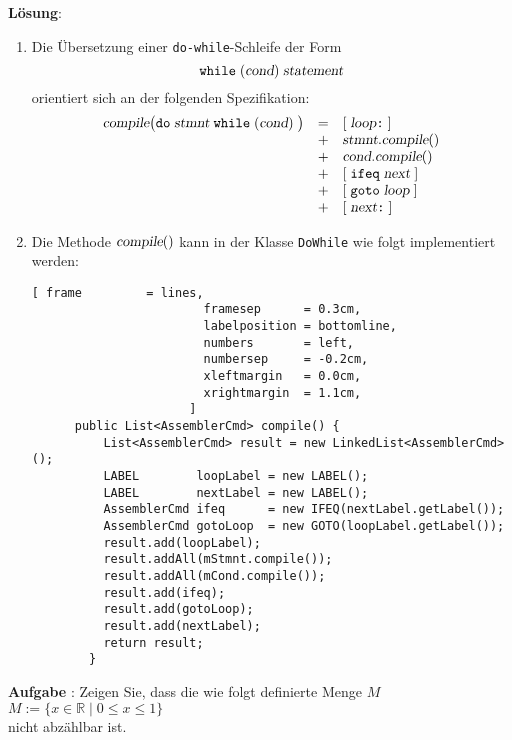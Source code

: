 \documentclass{article}
\newcounter{aufgabe}
\newcommand{\exercise}{\vspace*{0.1cm}

\stepcounter{aufgabe}
\vspace*{0.3cm}

\noindent
\textbf{Aufgabe \arabic{aufgabe}}: }
\newcommand{\solution}{
\vspace*{0.3cm}

\noindent
\textbf{L\"osung}: }
\begin{document}
\solution
\begin{enumerate}
\item Die \"Ubersetzung einer \texttt{do-while}-Schleife der Form
      \[ \texttt{while}\;(\textsl{cond})\;\textsl{statement} \]
      orientiert sich an der folgenden Spezifikation:
      \[
      \begin{array}[t]{lcl}
        \textsl{compile}\bigl(\mathtt{do}\; \textsl{stmnt}\; \texttt{while}\; (\textsl{cond})\;\bigr) 
        & = & 
        [\;\textsl{loop}\texttt{:}\;]            \\
        & + & \textsl{stmnt}.\textsl{compile}()    \\    
        & + & \textsl{cond}.\textsl{compile}()         \\
        & + & [\;\texttt{ifeq}\;\textsl{next}\;] \\
        & + & [\;\texttt{goto}\;\textsl{loop}\;]    \\    
        & + & [\;\textsl{next}\texttt{:}\;]         
      \end{array}
      \]
\item Die Methode $\textsl{compile}()$ kann in der Klasse \texttt{DoWhile} wie folgt implementiert werden:
      \begin{Verbatim}[ frame         = lines, 
                        framesep      = 0.3cm, 
                        labelposition = bottomline,
                        numbers       = left,
                        numbersep     = -0.2cm,
                        xleftmargin   = 0.0cm,
                        xrightmargin  = 1.1cm,
                      ]
      public List<AssemblerCmd> compile() {
          List<AssemblerCmd> result = new LinkedList<AssemblerCmd>();
          LABEL        loopLabel = new LABEL();
          LABEL        nextLabel = new LABEL();
          AssemblerCmd ifeq      = new IFEQ(nextLabel.getLabel());
          AssemblerCmd gotoLoop  = new GOTO(loopLabel.getLabel());
          result.add(loopLabel);
          result.addAll(mStmnt.compile());
          result.addAll(mCond.compile());
          result.add(ifeq);
          result.add(gotoLoop);
          result.add(nextLabel);
          return result;
        }
      \end{Verbatim}
\end{enumerate}

\pagebreak

\noindent
{}
\exercise
Zeigen Sie, dass die wie folgt definierte Menge $M$ 
\\[0.2cm]
\hspace*{1.3cm}
$M := \{ x \in \mathbb{R} \mid 0 \leq x \leq 1 \}$
\\[0.2cm] 
nicht abz\"ahlbar ist.
\end{document}
